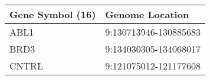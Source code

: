 \begin{tabular}{ll}
\toprule
Gene Symbol (16) &       Genome Location \\
\midrule
            ABL1 & 9:130713946-130885683 \\
            BRD3 & 9:134030305-134068017 \\
           CNTRL & 9:121075012-121177608 \\
\bottomrule
\end{tabular}
